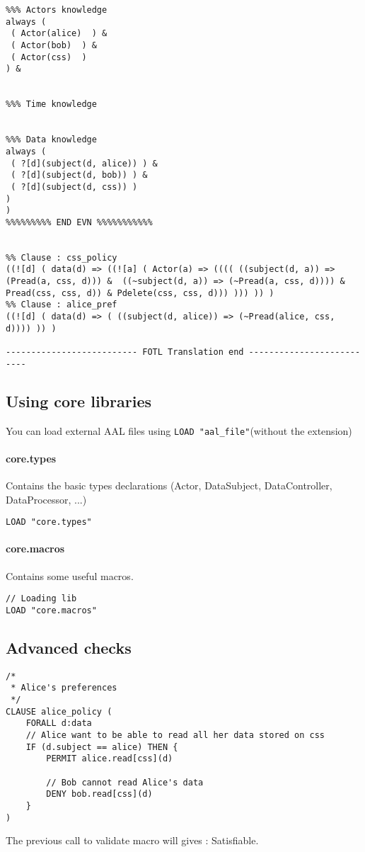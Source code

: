 \begin{itemize}
{\begin{lstlisting}
%%% Actors knowledge
always (
 ( Actor(alice)  ) &
 ( Actor(bob)  ) &
 ( Actor(css)  )
) &


%%% Time knowledge


%%% Data knowledge
always (
 ( ?[d](subject(d, alice)) ) &
 ( ?[d](subject(d, bob)) ) &
 ( ?[d](subject(d, css)) )
)
)
%%%%%%%%% END EVN %%%%%%%%%%%


%% Clause : css_policy
((![d] ( data(d) => ((![a] ( Actor(a) => (((( ((subject(d, a)) => (Pread(a, css, d))) &  ((~subject(d, a)) => (~Pread(a, css, d)))) & Pread(css, css, d)) & Pdelete(css, css, d))) ))) )) )
%% Clause : alice_pref
((![d] ( data(d) => ( ((subject(d, alice)) => (~Pread(alice, css, d)))) )) )

-------------------------- FOTL Translation end --------------------------
\end{lstlisting}
}
\end{itemize}


\subsection{Using core libraries}
You can load external AAL files using \texttt{LOAD "aal\_file"}(without the extension) 

\paragraph{core.types} Contains the basic types declarations (Actor, DataSubject, DataController, DataProcessor, ...)
\begin{lstlisting}
LOAD "core.types"
\end{lstlisting}

\paragraph{core.macros} Contains some useful macros.
\begin{lstlisting}
// Loading lib
LOAD "core.macros"
\end{lstlisting}




\subsection{Advanced checks}

\begin{lstlisting}
/*
 * Alice's preferences
 */
CLAUSE alice_policy (
    FORALL d:data
    // Alice want to be able to read all her data stored on css
    IF (d.subject == alice) THEN {
        PERMIT alice.read[css](d)

        // Bob cannot read Alice's data
        DENY bob.read[css](d)
    }
)
\end{lstlisting}
The previous call to validate macro will gives : Satisfiable.

